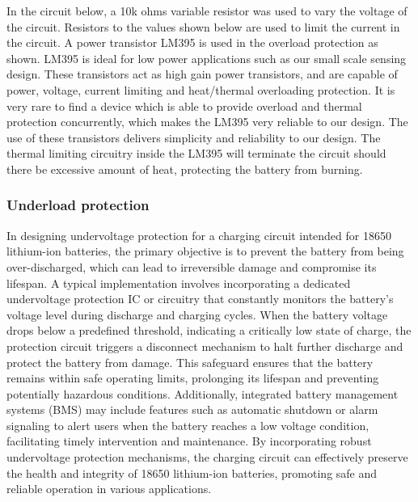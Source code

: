 \documentclass[class=report,11pt,crop=false]{standalone}
\begin{document}
	In the circuit below, a 10k ohms variable resistor was used to vary the voltage of the circuit. Resistors to the values shown below are used to limit the current in the circuit. A power transistor LM395 is used in the overload protection as shown. LM395 is ideal for low power applications such as our small scale sensing design. These transistors act as high gain power transistors, and are capable of power, voltage, current limiting and heat/thermal overloading protection. It is very rare to find a device which is able to provide overload and thermal protection concurrently, which makes the LM395 very reliable to our design. The use of these transistors delivers simplicity and reliability to our design. The thermal limiting circuitry inside the LM395 will terminate the circuit should there be excessive amount of heat, protecting the battery from burning. 
	
	
	\subsubsection{Underload protection}
	\vspace{0.5cm}
	In designing undervoltage protection for a charging circuit intended for 18650 lithium-ion batteries, the primary objective is to prevent the battery from being over-discharged, which can lead to irreversible damage and compromise its lifespan. A typical implementation involves incorporating a dedicated undervoltage protection IC or circuitry that constantly monitors the battery's voltage level during discharge and charging cycles. When the battery voltage drops below a predefined threshold, indicating a critically low state of charge, the protection circuit triggers a disconnect mechanism to halt further discharge and protect the battery from damage. This safeguard ensures that the battery remains within safe operating limits, prolonging its lifespan and preventing potentially hazardous conditions. Additionally, integrated battery management systems (BMS) may include features such as automatic shutdown or alarm signaling to alert users when the battery reaches a low voltage condition, facilitating timely intervention and maintenance. By incorporating robust undervoltage protection mechanisms, the charging circuit can effectively preserve the health and integrity of 18650 lithium-ion batteries, promoting safe and reliable operation in various applications.
	
	
\end{document}
